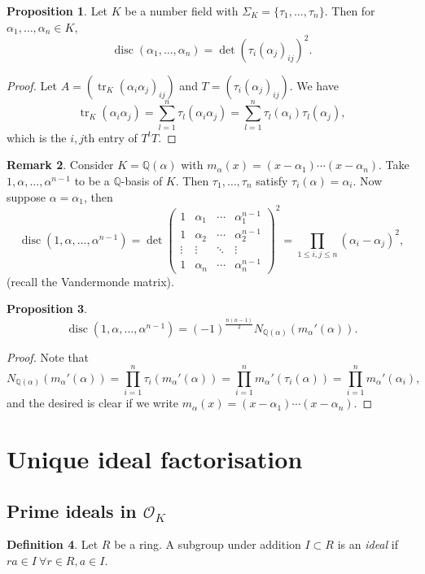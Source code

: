 \documentclass{article}
\newcommand{\Q}{\mathbb{Q}}
\newcommand{\tr}{\operatorname{tr}}
\newcommand{\disc}{\operatorname{disc}}
\newcommand{\ri}{\mathcal{O}}
\theoremstyle{definition}
\newtheorem{defn}{Definition}[subsection]
\newtheorem{prop}[defn]{Proposition}
\newtheorem{remark}[defn]{Remark}
\begin{document}
\begin{prop}
\label{prop:discinemb}
Let $K$ be a number field with $\Sigma_K=\{\tau_1,\ldots,\tau_n\}$. Then for $\alpha_1,\ldots,\alpha_n\in K$,
\[
\disc(\alpha_1,\ldots,\alpha_n)=\det (\tau_i(\alpha_j)_{ij})^2.
\]
\end{prop}
\begin{proof}
Let $A=(\tr_K(\alpha_i\alpha_j)_{ij})$ and $T=(\tau_i(\alpha_j)_{ij})$. We have 
\[
\tr_K(\alpha_i\alpha_j)=\sum_{l=1}^n\tau_l(\alpha_i\alpha_j)=\sum_{l=1}^n\tau_l(\alpha_i)\tau_l(\alpha_j),
\]
which is the $i,j$th entry of $T^tT$.
\end{proof}

\begin{remark}
Consider $K=\Q(\alpha)$ with $m_\alpha(x)=(x-\alpha_1)\cdots(x-\alpha_n)$. Take $1,\alpha,\ldots,\alpha^{n-1}$ to be a $\Q$-basis of $K$. Then $\tau_1,\ldots,\tau_n$ satisfy $\tau_i(\alpha)=\alpha_i$. Now suppose $\alpha=\alpha_1$, then
\[
\disc(1,\alpha,\ldots,\alpha^{n-1})=\det\begin{pmatrix}
1 & \alpha_1 & \cdots & \alpha_1^{n-1} \\
1 & \alpha_2 & \cdots & \alpha_2^{n-1} \\
\vdots & \vdots & \ddots & \vdots \\
1 & \alpha_n & \cdots & \alpha_n^{n-1}
\end{pmatrix}^2=\prod_{1\leq i,j\leq n}(\alpha_i-\alpha_j)^2,
\]
(recall the Vandermonde matrix).
\end{remark}

\begin{prop}
\label{prop:discandnormofderi}
\[
\disc(1,\alpha,\ldots,\alpha^{n-1})=(-1)^{\frac{n(n-1)}{2}}N_{\Q(\alpha)}(m_\alpha'(\alpha)).
\]
\end{prop}
\begin{proof}
Note that
\[
N_{\Q(\alpha)}(m_\alpha'(\alpha))=\prod_{i=1}^n\tau_i(m_\alpha'(\alpha))=\prod_{i=1}^n m_\alpha'(\tau_i(\alpha))=\prod_{i=1}^n m_\alpha'(\alpha_i),
\]
and the desired is clear if we write $m_\alpha(x)=(x-\alpha_1)\cdots(x-\alpha_n)$.
\end{proof}

\section{Unique ideal factorisation}
\subsection{Prime ideals in $\ri_K$}
\begin{defn}
Let $R$ be a ring. A subgroup under addition $I\subset R$ is an \textit{ideal} if $ra\in I \ \forall r\in R,a\in I$.
\end{defn}
\end{document}
